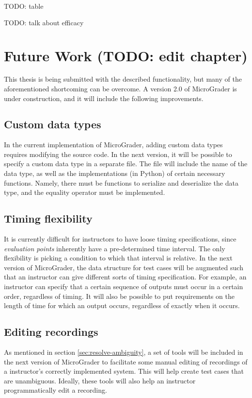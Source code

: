 \documentclass[12pt]{article}
\begin{document}
TODO: table

TODO: talk about efficacy

\newpage
\section{Future Work (TODO: edit chapter)}
This thesis is being submitted with the described functionality, but many of the aforementioned shortcoming can be overcome.  A version 2.0 of MicroGrader is under construction, and it will include the following improvements.

\subsection{Custom data types}
In the current implementation of MicroGrader, adding custom data types requires modifying the source code.  In the next version, it will be possible to specify a custom data type in a separate file.  The file will include the name of the data type, as well as the implementations (in Python) of certain necessary functions.  Namely, there must be functions to serialize and deserialize the data type, and the equality operator must be implemented.

\subsection{Timing flexibility}
It is currently difficult for instructors to have loose timing specifications, since \textit{evaluation points} inherently have a pre-determined time interval.  The only flexibility is picking a condition to which that interval is relative.  In the next version of MicroGrader, the data structure for test cases will be augmented such that an instructor can give different sorts of timing specification.  For example, an instructor can specify that a certain sequence of outputs must occur in a certain order, regardless of timing.  It will also be possible to put requirements on the length of time for which an output occurs, regardless of exactly when it occurs.

\subsection{Editing recordings}
As mentioned in section \ref{sec:resolve-ambiguity}, a set of tools will be included in the next version of MicroGrader to facilitate some manual editing of recordings of a instructor's correctly implemented system.  This will help create test cases that are unambiguous.  Ideally, these tools will also help an instructor programmatically edit a recording.
\end{document}
